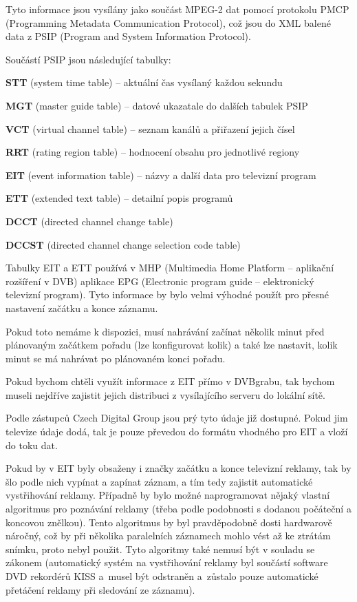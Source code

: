 Tyto informace jsou vysílány jako součást MPEG-2 dat pomocí protokolu PMCP (Programming Metadata Communication Protocol), což jsou do XML balené data z PSIP (Program and System Information Protocol).

Součástí PSIP jsou následující tabulky:
\bitem
\item \textbf{STT} (system time table) -- aktuální čas vysílaný každou sekundu
\item \textbf{MGT} (master guide table) -- datové ukazatale do dalších tabulek PSIP
\item \textbf{VCT} (virtual channel table) -- seznam kanálů a přiřazení jejich čísel
\item \textbf{RRT} (rating region table) -- hodnocení obsahu pro jednotlivé regiony
\item \textbf{EIT} (event information table) -- názvy a další data pro televizní program
\item \textbf{ETT} (extended text table) -- detailní popis programů
\item \textbf{DCCT} (directed channel change table)
\item \textbf{DCCST} (directed channel change selection code table)
\eitem

Tabulky EIT a ETT používá v MHP (Multimedia Home Platform -- aplikační rozšíření v DVB) aplikace EPG (Electronic program guide -- elektronický televizní program). Tyto informace by bylo velmi výhodné použít pro přesné nastavení začátku a konce záznamu.

Pokud toto nemáme k dispozici, musí nahrávání začínat několik minut před plánovaným začátkem pořadu (lze konfigurovat kolik) a také lze nastavit, kolik minut se má nahrávat po plánovaném konci pořadu.

Pokud bychom chtěli využít informace z EIT přímo v DVBgrabu, tak bychom museli nejdříve zajistit jejich distribuci z vysílajícího serveru do lokální sítě.

Podle zástupců Czech Digital Group jsou prý tyto údaje již dostupné. Pokud jim televize údaje dodá, tak je pouze převedou do formátu vhodného pro EIT a vloží do toku dat.

Pokud by v EIT byly obsaženy i značky začátku a konce televizní reklamy, tak by šlo podle nich vypínat a zapínat záznam, a tím tedy zajistit automatické vystřihování reklamy. Případně by bylo možné naprogramovat nějaký vlastní algoritmus pro poznávání reklamy (třeba podle podobnosti s dodanou počáteční a koncovou znělkou). Tento algoritmus by byl pravděpodobně dosti hardwarově náročný, což by při několika paralelních záznamech mohlo vést až ke ztrátám snímku, proto nebyl použit. Tyto algoritmy také nemusí být v souladu se zákonem (automatický systém na vystřihování reklamy byl součástí software DVD rekordérů KISS a~musel být odstraněn a~zůstalo pouze automatické přetáčení reklamy při sledování ze záznamu).
\vfill
\pagebreak
